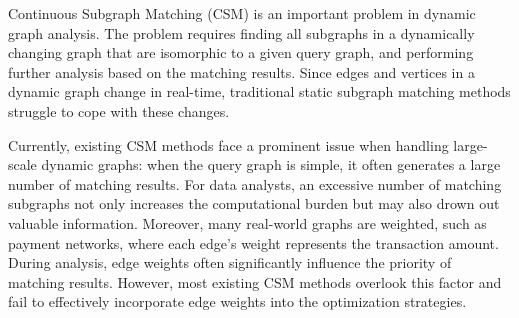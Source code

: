 \begin{enabstract}
	Continuous Subgraph Matching (CSM) is an important problem in dynamic graph analysis. 
	The problem requires finding all subgraphs in a dynamically changing graph that are isomorphic to a given query graph, and performing further analysis based on the matching results. 
	Since edges and vertices in a dynamic graph change in real-time, traditional static subgraph matching methods struggle to cope with these changes.

    Currently, existing CSM methods face a prominent issue when handling large-scale dynamic graphs: when the query graph is simple, it often generates a large number of matching results. 
	For data analysts, an excessive number of matching subgraphs not only increases the computational burden but may also drown out valuable information. 
	Moreover, many real-world graphs are weighted, such as payment networks, where each edge’s weight represents the transaction amount. 
	During analysis, edge weights often significantly influence the priority of matching results. However, most existing CSM methods overlook this factor and fail to effectively incorporate edge weights into the optimization strategies.


\end{enabstract}
